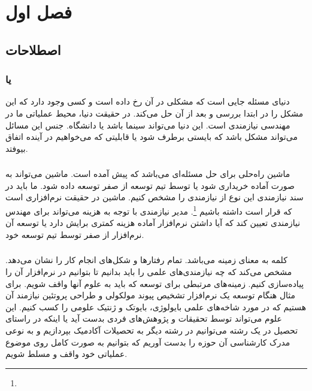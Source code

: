 \section{فصل اول}

\subsection{اصطلاحات}

\subsubsection{ یا }

دنیای مسئله جایی است که مشکلی در آن رخ داده است و کسی وجود دارد که این مشکل را
در ابتدا بررسی و بعد از آن حل می‌کند. در حقیقت دنیا، محیط عملیاتی ما در مهندسی
نیازمندی است. این دنیا می‌تواند سینما باشد یا دانشگاه. جنس این مسائل می‌تواند
مشکل باشد که بایستی برطرف شود یا قابلیتی که می‌خواهیم در آینده اتفاق بیوفتد.

\subsubsection{}

ماشین راه‌حلی برای حل مسئله‌ای می‌باشد که پیش آمده است. ماشین می‌تواند به صورت
آماده خریداری شود یا توسط تیم توسعه از صفر توسعه داده شود. ما باید در سند
نیازمندی این نوع از نیازمندی را مشخص کنیم. ماشین در حقیقت نرم‌افزاری است که قرار
است داشته باشیم \footnote{}. مدیر نیازمندی با توجه به هزینه
می‌تواند برای مهندس نیازمندی تعیین کند که آیا داشتن نرم‌افزار آماده هزینه کمتری
برایش دارد یا توسعه آن نرم‌افزار از صفر توسط تیم توسعه خود.

\subsubsection{}

کلمه  به معنای زمینه می‌باشد. تمام رفتار‌ها و شکل‌های انجام کار را
نشان می‌دهد. مشخص می‌کند که چه نیازمندی‌های علمی را باید بدانیم تا بتوانیم در
نرم‌افزار آن را پیاده‌سازی کنیم. زمینه‌های مرتبطی برای توسعه‌ که باید به علوم
آنها واقف شویم. برای مثال هنگام توسعه یک نرم‌افزار تشخیص پیوند مولکولی و طراحی
پروتئین نیازمند آن هستیم که در مورد شاخه‌های علمی بایولوژی، بایوتک و ژنتیک علومی
را کسب کنیم. این علوم می‌تواند توسط تحقیقات و پژوهش‌های فردی بدست آید یا اینکه
در راستای تحصیل در یک رشته می‌توانیم در رشته دیگر به تحصیلات آکادمیک بپردازیم و
به نوعی مدرک کارشناسی آن حوزه را بدست آوریم که بتوانیم به صورت کامل روی موضوع
عملیاتی خود واقف و مسلط شویم.

